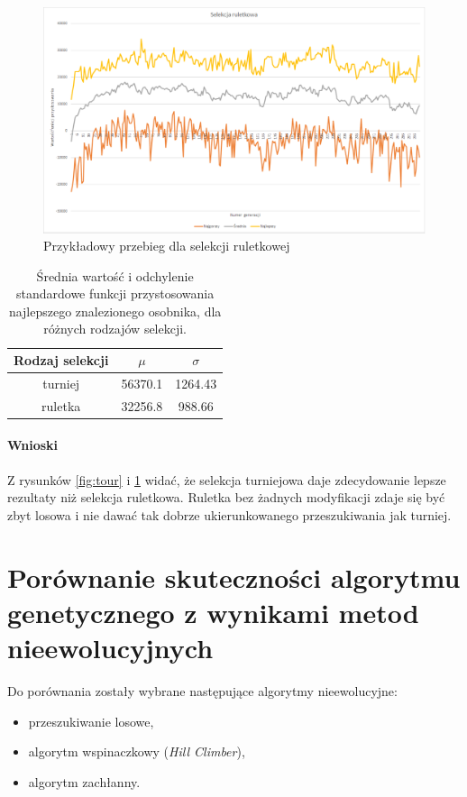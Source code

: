 \documentclass{article}
\begin{document}
	\begin{figure}[H]
		\centering
		\includegraphics[width=1\linewidth]{roulette.png}
		\caption{Przykładowy przebieg dla selekcji ruletkowej}
		\label{fig:roulette}
	\end{figure}

	\begin{table}[H]
		\begin{center}
			\begin{tabular}{ |c|c|c| } 
				\hline
				Rodzaj selekcji & $\mu$ & $\sigma$ \\ 
				\hline
				turniej & 56370.1 & 1264.43 \\ 
				ruletka & 32256.8 & 988.66 \\ 
				\hline
			\end{tabular}
			\caption{Średnia wartość i odchylenie standardowe funkcji przystosowania najlepszego znalezionego osobnika, dla różnych rodzajów selekcji.}
			\label{tab:gen}
		\end{center}
	\end{table}
	\paragraph{Wnioski}	
	Z rysunków \ref{fig:tour} i \ref{fig:roulette} widać, że selekcja turniejowa daje zdecydowanie lepsze rezultaty niż selekcja ruletkowa. Ruletka bez żadnych modyfikacji zdaje się być zbyt losowa i nie dawać tak dobrze ukierunkowanego przeszukiwania jak turniej.
	
	\section{Porównanie skuteczności algorytmu genetycznego z wynikami metod nieewolucyjnych}
	Do porównania zostały wybrane następujące algorytmy nieewolucyjne:
	\begin{itemize}	
		\item przeszukiwanie losowe,
		\item algorytm wspinaczkowy (\textit{Hill Climber}),
		\item algorytm zachłanny.
	\end{itemize}
	
\end{document}
